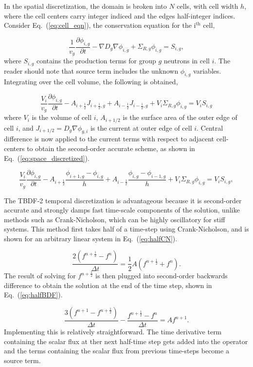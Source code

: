 \documentclass[12pt]{article}
\newcommand{\fn}[1]{\left( #1 \right)}
\newcommand{\dxdt}[1]{\frac{\partial #1}{\partial t}}
\newcommand{\be}{\begin{equation}}
\newcommand{\ee}{\end{equation}}
\newcommand{\LEQ}[1]{\label{eq:#1}}
\newcommand{\EQ}[1]{Eq.~(\ref{eq:#1})}
\newcommand{\half}{\frac{1}{2}}
\begin{document}
In the spatial discretization, the domain is broken into $N$ cells, with cell 
 width $h$, where the cell centers carry integer indiced and the edges half-integer indices. 
Consider \EQ{cell_eqn}, the conservation equation for the i$^{\text{th}}$ cell,

\be
	 \frac{1}{v_g} \dxdt{\phi_{i,g}} - \nabla D_{g} \nabla \phi_{i,g} + 	
	 	\Sigma_{R,g} \phi_{i,g}  =  S_{i,g},
	\LEQ{cell_eqn} 
\ee
where $S_{i,g}$ contains the production terms for group $g$ neutrons in cell $i$. 
The reader should note that source term includes the unknown $ \phi_{i,g} $ variables. 
Integrating over the cell volume, the following is obtained,

\be
	\frac{V_i}{v_g} \dxdt{\phi_{i,g}} - A_{i+\half} J_{i+\half,g} + A_{i-\half} 
		J_{i-\half,g} + V_i \Sigma_{R,g} \phi_{i,g} = V_i S_{i,g}
\ee
where $V_i $ is the volume of cell $i$, $ A_{i+1/2} $ is the surface area of 
 the outer edge of cell $i$, and $ J_{i+1/2} = D_g \nabla \phi_{g,i} $ is the 
 current at outer edge of cell $i$. 
Central difference is now applied to the current terms with respect to adjacent 
 cell-centers to obtain the second-order accurate scheme, as shown in \EQ{space_discretized}.

\be
	\frac{V_i}{v_g} \dxdt{\phi_{i,g}} - A_{i+\half} \frac{\phi_{i+1,g} - 
		\phi_{i,g}}{h} + A_{i-\half} \frac{\phi_{i,g} - \phi_{i-1,g}}{h} + 
		V_i \Sigma_{R,g} \phi_{i,g} = V_i S_{i,g},
 	\LEQ{space_discretized} 
\ee


The TBDF-2 temporal discretization is advantageous because it is second-order 
 accurate and strongly damps fast time-scale components of the solution, unlike 
 methods such as Crank-Nicholson, which can be highly oscillatory for stiff systems. 
This method first takes half of a time-step using Crank-Nicholson, and is shown 
 for an arbitrary linear system in \EQ{halfCN}. 

\be
	\frac{2 \fn{ f^{n+\half} - f^n }}{\Delta t} =  \half A \fn{f^{n+\half} + f^n}.
	\LEQ{halfCN} 
\ee
The result of solving for $f^{n+\half}$ is then plugged into second-order 
backwards difference to obtain the solution at the end of the time step, shown in \EQ{halfBDF}.

\be
	\frac{3 \fn{ f^{n+1} - f^{n+\half} }}{\Delta t} - \frac{f^{n+\half} - 
		f^n}{\Delta t} = A f^{n+1}.
	\LEQ{halfBDF} 
\ee 
Implementing this is relatively straightforward. 
The time derivative term containing the scalar flux at ther next half-time step 
 gets added into the operator and the terms containing the scalar flux from 
 previous time-steps become a source term.
\end{document}
